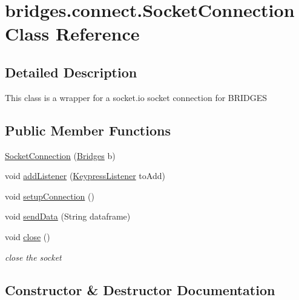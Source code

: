 \hypertarget{classbridges_1_1connect_1_1_socket_connection}{}\section{bridges.\+connect.\+Socket\+Connection Class Reference}
\label{classbridges_1_1connect_1_1_socket_connection}


\subsection{Detailed Description}
This class is a wrapper for a socket.\+io socket connection for B\+R\+I\+D\+G\+ES \subsection*{Public Member Functions}
\begin{DoxyCompactItemize}
\item 
\hyperlink{classbridges_1_1connect_1_1_socket_connection_a876856ccf07a3ae6519d7f7b94d0e65a}{Socket\+Connection} (\hyperlink{classbridges_1_1connect_1_1_bridges}{Bridges} b)
\item 
void \hyperlink{classbridges_1_1connect_1_1_socket_connection_a94dd56d930f24abf547bce3ad0fb723e}{add\+Listener} (\hyperlink{interfacebridges_1_1connect_1_1_keypress_listener}{Keypress\+Listener} to\+Add)
\item 
void \hyperlink{classbridges_1_1connect_1_1_socket_connection_ac5467b4da6cd41b0cee00be5b4cbc60d}{setup\+Connection} ()
\item 
void \hyperlink{classbridges_1_1connect_1_1_socket_connection_a9f62a8dbff3debd6d226f9a0d59a4c33}{send\+Data} (String dataframe)
\item 
void \hyperlink{classbridges_1_1connect_1_1_socket_connection_aeb96c978c1dd5125f3068ecc7c79e3ca}{close} ()
\begin{DoxyCompactList}\small\item\em close the socket \end{DoxyCompactList}\end{DoxyCompactItemize}


\subsection{Constructor \& Destructor Documentation}
\mbox{\label{classbridges_1_1connect_1_1_socket_connection_a876856ccf07a3ae6519d7f7b94d0e65a}} 
